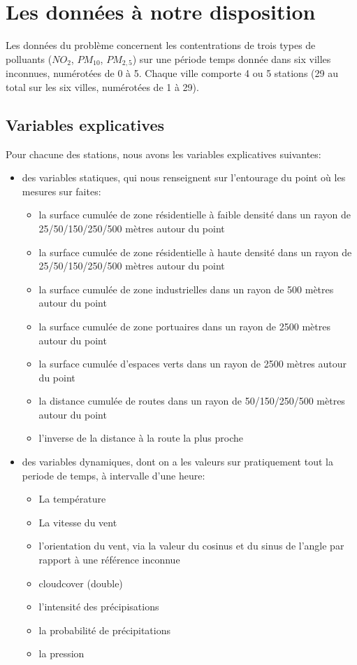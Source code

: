 \section{Les données à notre disposition}

Les données du problème concernent les contentrations de trois types de polluants ($NO_2$, $PM_{10}$, $PM_{2,5}$) sur une période temps donnée dans six villes inconnues, numérotées de 0 à 5.
Chaque ville comporte 4 ou 5 stations (29 au total sur les six villes, numérotées de 1 à 29).

\subsection{Variables explicatives}

Pour chacune des stations, nous avons les variables explicatives suivantes:
\begin{itemize}
  \item des variables statiques, qui nous renseignent sur l'entourage du point où les mesures sur faites:
  \begin{itemize}
    \item la surface cumulée de zone résidentielle à faible densité dans un rayon de 25/50/150/250/500 mètres autour du point
    \item la surface cumulée de zone résidentielle à haute densité dans un rayon de 25/50/150/250/500 mètres autour du point
    \item la surface cumulée de zone industrielles dans un rayon de 500 mètres autour du point
    \item la surface cumulée de zone portuaires dans un rayon de 2500 mètres autour du point
    \item la surface cumulée d'espaces verts dans un rayon de 2500 mètres autour du point
    \item la distance cumulée de routes dans un rayon de 50/150/250/500 mètres autour du point
    \item l'inverse de la distance à la route la plus proche
  \end{itemize}
  \item des variables dynamiques, dont on a les valeurs sur pratiquement tout la periode de temps, à intervalle d'une heure:
  \begin{itemize}
    \item La température
    \item La vitesse du vent
    \item l'orientation du vent, via la valeur du cosinus et du sinus de l'angle par rapport à une référence inconnue
    \item cloudcover (double)
    \item l'intensité des précipisations
    \item la probabilité de précipitations
    \item la pression
  \end{itemize}
\end{itemize}

